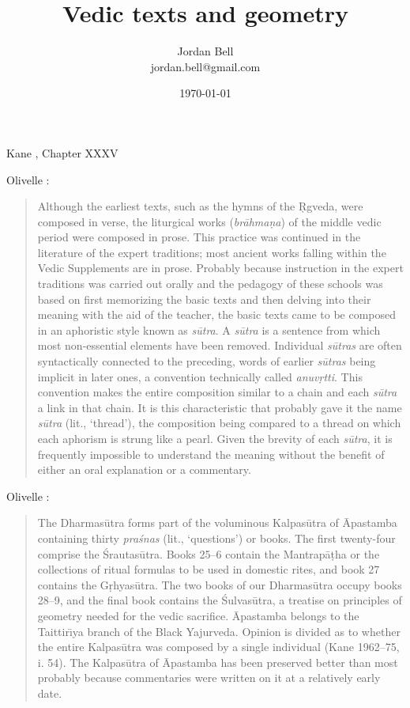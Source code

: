 \documentclass{article}
\begin{document}
\title{Vedic texts and geometry} 
\author{Jordan Bell\\
jordan.bell@gmail.com}
\date{\today}

\maketitle

Kane \cite[p.~1224]{kane22}, Chapter XXXV


Olivelle \cite[pp.~xxiii--xxiv]{olivelle}:

\begin{quote}
Although the earliest texts, such as the hymns of the \d{R}gveda,
were composed in verse, the liturgical works ({\em br\=ahma\d{n}a}) of the
middle vedic period were composed in prose. This practice was
continued in the literature of the expert traditions; most ancient
works falling within the Vedic Supplements are in prose. Probably
because instruction in the expert traditions was carried out
orally and the pedagogy of these schools was based on first
memorizing the basic texts and then delving into their meaning
with the aid of the teacher, the basic texts came to be composed
in an aphoristic style known as {\em s\=utra}.
 A {\em s\=utra} is a sentence
from which most non-essential elements have been removed.
Individual {\em s\=utras} are often syntactically connected to the
preceding, words of earlier {\em s\=utras} being implicit in later ones, a
convention technically called {\em anuv\d{r}tti}. This convention makes
the entire composition similar to a chain and each {\em s\=utra} a link
in that chain. It is this characteristic that probably gave it the
name {\em s\=utra} (lit., `thread'), the composition being compared to
a thread on which each aphorism is strung like a pearl. Given
the brevity of each {\em s\=utra}, it is frequently impossible to understand
the meaning without the benefit of either an oral explanation
or a commentary.
\end{quote}

Olivelle \cite[p.~3]{olivelle}:

\begin{quote}
The Dharmas\=utra forms part of the voluminous Kalpas\=utra of
\=Apastamba containing thirty {\em pra\'snas} (lit., `questions') or books.
The first twenty-four comprise the \'Srautas\=utra. Books 25--6
contain the Mantrap\=a\d{t}ha or the collections of ritual formulas to
be used in domestic rites, and book 27 contains the G\d{r}hyas\=utra.
The two books of our Dharmas\=utra occupy books 28--9, and
the final book contains the \'Sulvas\=utra, a treatise on principles of
geometry needed for the vedic sacrifice. \=Apastamba belongs to
the Taittir{\=\i}ya branch of the Black Yajurveda. Opinion is divided
as to whether the entire Kalpas\=utra was composed by a single
individual (Kane 1962--75, i. 54). The Kalpas\=utra of \=Apastamba
has been preserved better than most probably because commentaries
were written on it at a relatively early date.
\end{quote}
\end{document}
